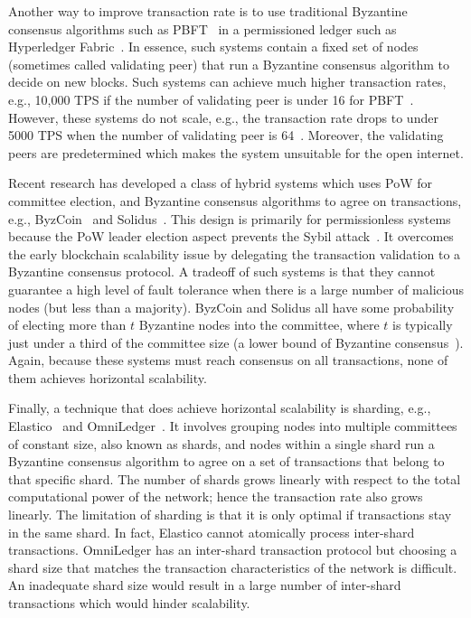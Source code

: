 Another way to improve transaction rate is to use traditional Byzantine consensus algorithms such as PBFT~\cite{castro1999practical} in a permissioned ledger such as Hyperledger Fabric~\cite{cachin2016architecture}.
In essence, such systems contain a fixed set of nodes (sometimes called validating peer) that run a Byzantine consensus algorithm to decide on new blocks.
Such systems can achieve much higher transaction rates, e.g., 10,000 TPS if the number of validating peer is under 16 for PBFT~\cite[Section 5.2]{miller2016honey}.
However, these systems do not scale, e.g., the transaction rate drops to under 5000 TPS when the number of validating peer is 64~\cite[Section 5.2]{miller2016honey}.
Moreover, the validating peers are predetermined which makes the system unsuitable for the open internet.

Recent research has developed a class of hybrid systems which uses PoW for committee election,
and Byzantine consensus algorithms to agree on transactions, e.g., ByzCoin~\cite{kogias2016enhancing} and Solidus~\cite{abraham2016solidus}.
This design is primarily for permissionless systems because the PoW leader election aspect prevents the Sybil attack~\cite{douceur2002sybil}.
It overcomes the early blockchain scalability issue by delegating the transaction validation to a Byzantine consensus protocol.
A tradeoff of such systems is that they cannot guarantee a high level of fault tolerance when there is a large number of malicious nodes (but less than a majority).
ByzCoin and Solidus all have some probability of electing more than $t$ Byzantine nodes into the committee,
where $t$ is typically just under a third of the committee size (a lower bound of Byzantine consensus~\cite{pease1980reaching}).
Again, because these systems must reach consensus on all transactions,
none of them achieves horizontal scalability.

Finally, a technique that does achieve horizontal scalability is sharding, e.g., Elastico~\cite{luu2016elastico} and OmniLedger~\cite{kokoris2017omniledger}.
It involves grouping nodes into multiple committees of constant size, also known as shards,
and nodes within a single shard run a Byzantine consensus algorithm to agree on a set of transactions that belong to that specific shard.
The number of shards grows linearly with respect to the total computational power of the network;
hence the transaction rate also grows linearly.
The limitation of sharding is that it is only optimal if transactions stay in the same shard.
In fact, Elastico cannot atomically process inter-shard transactions.
OmniLedger has an inter-shard transaction protocol but choosing a shard size that matches the transaction characteristics of the network is difficult.
An inadequate shard size would result in a large number of inter-shard transactions which would hinder scalability.

